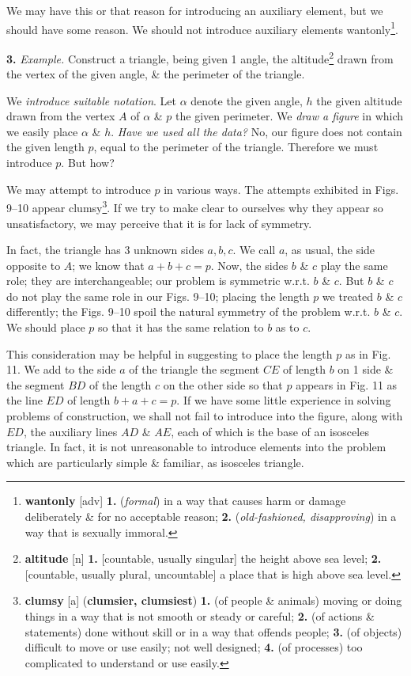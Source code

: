 \documentclass[oneside]{book}
\numberwithin{equation}{section}
\begin{document}
We may have this or that reason for introducing an auxiliary element, but we should have some reason. We should not introduce auxiliary elements wantonly\footnote{\textbf{wantonly} [adv] \textbf{1.} (\textit{formal}) in a way that causes harm or damage deliberately \& for no acceptable reason; \textbf{2.} (\textit{old-fashioned, disapproving}) in a way that is sexually immoral.}.

\textbf{3.} \textit{Example.} Construct a triangle, being given 1 angle, the altitude\footnote{\textbf{altitude} [n] \textbf{1.} [countable, usually singular] the height above sea level; \textbf{2.} [countable, usually plural, uncountable] a place that is high above sea level.} drawn from the vertex of the given angle, \& the perimeter of the triangle.

We \textit{introduce suitable notation}. Let $\alpha$ denote the given angle, $h$ the given altitude drawn from the vertex $A$ of $\alpha$ \& $p$ the given perimeter. We \textit{draw a figure} in which we easily place $\alpha$ \& $h$. \textit{Have we used all the data?} No, our figure does not contain the given length $p$, equal to the perimeter of the triangle. Therefore we must introduce $p$. But how?

We may attempt to introduce $p$ in various ways. The attempts exhibited in Figs. 9--10 appear clumsy\footnote{\textbf{clumsy} [a] (\textbf{clumsier, clumsiest}) \textbf{1.} (of people \& animals) moving or doing things in a way that is not smooth or steady or careful; \textbf{2.} (of actions \& statements) done without skill or in a way that offends people; \textbf{3.} (of objects) difficult to move or use easily; not well designed; \textbf{4.} (of processes) too complicated to understand or use easily.}. If we try to make clear to ourselves why they appear so unsatisfactory, we may perceive that it is for lack of symmetry.

In fact, the triangle has 3 unknown sides $a,b,c$. We call $a$, as usual, the side opposite to $A$; we know that $a + b + c = p$. Now, the sides $b$ \& $c$ play the same role; they are interchangeable; our problem is symmetric w.r.t. $b$ \& $c$. But $b$ \& $c$ do not play the same role in our Figs. 9--10; placing the length $p$ we treated $b$ \& $c$ differently; the Figs. 9--10 spoil the natural symmetry of the problem w.r.t. $b$ \& $c$. We should place $p$ so that it has the same relation to $b$ as to $c$.

This consideration may be helpful in suggesting to place the length $p$ as in Fig. 11. We add to the side $a$ of the triangle the segment $CE$ of length $b$ on 1 side \& the segment $BD$ of the length $c$ on the other side so that $p$ appears in Fig. 11 as the line $ED$ of length $b + a + c = p$. If we have some little experience in solving problems of construction, we shall not fail to introduce into the figure, along with $ED$, the auxiliary lines $AD$ \& $AE$, each of which is the base of an isosceles triangle. In fact, it is not unreasonable to introduce elements into the problem which are particularly simple \& familiar, as isosceles triangle.
\end{document}
